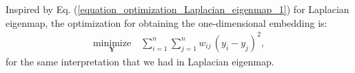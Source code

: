 \documentclass[lang=cn,10pt]{gorgeousnbook}
\numberwithin{equation}{section}%
\numberwithin{figure}{section}%
\begin{document}

Inspired by Eq. (\ref{equation_optimization_Laplacian_eigenmap_1}) for Laplacian eigenmap, the optimization for obtaining the one-dimensional embedding is:
\begin{align}\label{equation_optimization_LPP_1}
\underset{\boldsymbol{Y}}{\text{minimize}} \quad \sum_{i=1}^n \sum_{j=1}^n w_{ij}\, (y_i - y_j)^2,
\end{align}
for the same interpretation that we had in Laplacian eigenmap. 
\end{document}
